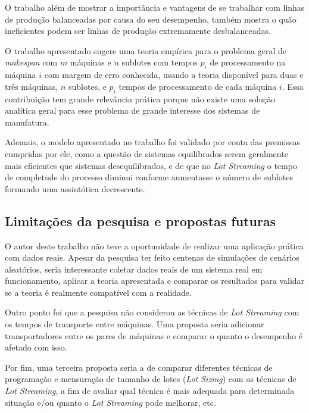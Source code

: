O trabalho além de mostrar a importância e vantagens de se trabalhar com linhas de produção balanceadas por causa do seu desempenho, também mostra o quão ineficientes podem ser linhas de produção extremamente desbalanceadas. 

O trabalho apresentado sugere uma teoria empírica para o problema geral de \textit{makespan} com $m$ máquinas e $n$ sublotes com tempos $p_i$ de processamento na máquina $i$ com margem de erro conhecida, usando a teoria disponível para duas e três máquinas, $n$ sublotes, e $p_i$ tempos de processamento de cada máquina $i$. Essa contribuição tem grande relevância prática porque não existe uma solução analítica geral para esse problema de grande interesse dos sistemas de manufatura.

Ademais, o modelo apresentado no trabalho foi validado por conta das premissas cumpridas por ele, como a questão de sistemas equilibrados serem geralmente mais eficientes que sistemas desequilibrados, e de que no \textit{Lot Streaming} o tempo de completude do processo diminui conforme aumentasse o número de sublotes formando uma assintótica decrescente.


    \subsection{Limitações da pesquisa e propostas futuras}
    
    O autor deste trabalho não teve a oportunidade de realizar uma aplicação prática com dados reais. Apesar da pesquisa ter feito centenas de simulações de cenários aleatórios, seria interessante coletar dados reais de um sistema real em funcionamento, aplicar a teoria apresentada e comparar os resultados para validar se a teoria é realmente compatível com a realidade.
    
    Outro ponto foi que a pesquisa não considerou as técnicas de \textit{Lot Streaming} com os tempos de transporte entre máquinas. Uma proposta seria adicionar transportadores entre os pares de máquinas e comparar o quanto o desempenho é afetado com isso. 
    
    Por fim, uma terceira proposta seria a de comparar diferentes técnicas de programação e mensuração de tamanho de lotes (\textit{Lot Sizing}) com as técnicas de \textit{Lot Streaming}, a fim de avaliar qual técnica é mais adequada para determinada situação e/ou quanto o \textit{Lot Streaming} pode melhorar, etc.  